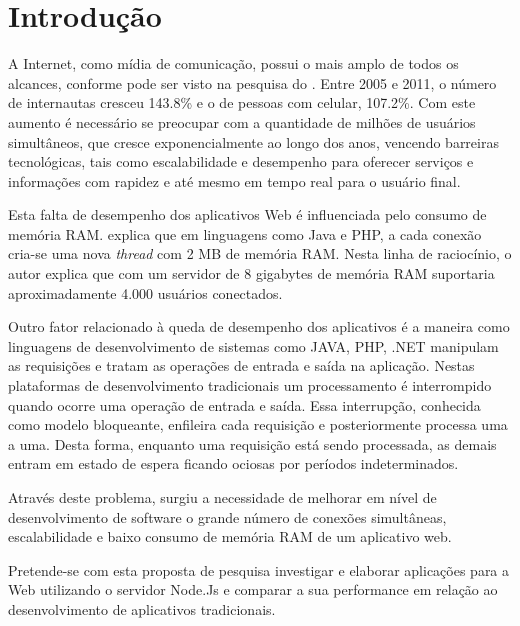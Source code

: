 \chapter{Introdução}
\label{introducao}

\vspace{-1.9cm}

  
  A Internet, como mídia de comunicação, possui o mais amplo de todos os alcances,
  conforme pode ser visto na pesquisa do . Entre 2005 e 2011, 
  o número de internautas cresceu 143.8\%  e o de pessoas com celular, 107.2\%.
  Com este aumento é necessário se preocupar com a quantidade de milhões de usuários simultâneos,
  que cresce exponencialmente ao longo dos anos, vencendo barreiras tecnológicas, tais como 
  escalabilidade e desempenho para oferecer serviços e informações com rapidez e até mesmo em tempo
  real para o usuário final.
  
  Esta falta de desempenho dos aplicativos Web é influenciada pelo consumo de memória RAM.  
  explica que em linguagens como Java e PHP, a cada conexão cria-se uma nova \textit{thread} com 2 MB de memória RAM. 
  Nesta linha de raciocínio, o autor explica que com um servidor de 8 gigabytes de memória RAM suportaria
  aproximadamente 4.000 usuários conectados.
  
  Outro fator relacionado à queda de desempenho dos aplicativos é a maneira como linguagens de desenvolvimento de sistemas como JAVA, PHP,
  .NET manipulam as requisições e tratam as operações de entrada e saída na aplicação.   
  Nestas plataformas de desenvolvimento tradicionais um processamento é interrompido quando ocorre uma operação de entrada e saída.
  Essa interrupção, conhecida como modelo bloqueante, enfileira cada requisição e posteriormente processa uma a uma. Desta forma, 
  enquanto uma requisição está sendo processada, as demais entram em estado de espera ficando ociosas
  por períodos indeterminados\cite{pereira}.
  
  Através deste problema, surgiu a necessidade de melhorar em nível de desenvolvimento de software o grande número de conexões 
  simultâneas, escalabilidade e baixo consumo de memória RAM de um aplicativo web\cite{oliveira}.
  
  Pretende-se com esta proposta de pesquisa investigar e elaborar aplicações para a Web 
  utilizando o servidor Node.Js e comparar a sua performance em relação ao desenvolvimento
  de aplicativos tradicionais.
  

